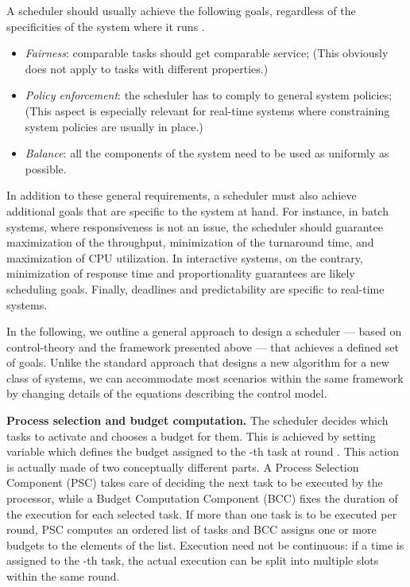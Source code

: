 \documentclass[a4paper]{article}
\begin{document}
A scheduler should usually achieve the following goals, regardless of the 
specificities of the system where it runs \cite{Tanenbaum-2007a}.
\begin{itemize}
\item \emph{Fairness}: comparable tasks should get comparable service;
      (This obviously does not apply to tasks with different properties.)
\item \emph{Policy enforcement}: the scheduler has to comply to general 
      system policies; (This aspect is especially relevant for real-time 
      systems where constraining system policies are usually in place.)
\item \emph{Balance}: all the components of the system need to be used as 
      uniformly as possible.
\end{itemize}

In addition to these general requirements, a scheduler must also achieve 
additional goals that are specific to the system at hand.
For instance, in batch systems, where responsiveness is not an issue, the 
scheduler should guarantee maximization of the throughput, minimization of 
the turnaround time, and maximization of CPU utilization.
In interactive systems, on the contrary, minimization of response time and 
proportionality guarantees are likely scheduling goals.
Finally, deadlines and predictability are specific to real-time systems.

In the following, we outline a general approach to design a scheduler --- based 
on control-theory and the framework presented above --- that achieves a defined
set of goals. Unlike the standard approach that designs a new algorithm for a 
new class of systems, we can accommodate most scenarios within the same
framework by changing details of the equations describing the control model.


\textbf{Process selection and budget computation.}
The scheduler decides which tasks to activate and chooses
a budget for them. This is achieved by setting variable  which defines
the budget assigned to the -th task at round .
This action is actually made of two conceptually different parts. A Process
Selection Component (PSC) takes care of deciding the next task to be executed
by the processor, while a Budget Computation Component (BCC) fixes the
duration of the execution for each selected task. If more than one
task is to be executed per round, PSC computes an ordered list of tasks
and BCC assigns one or more budgets to the elements of the list. 
Execution need not be continuous: if a time  is assigned to the 
-th task, the actual execution can be split into multiple slots within the 
same round.
\end{document}
